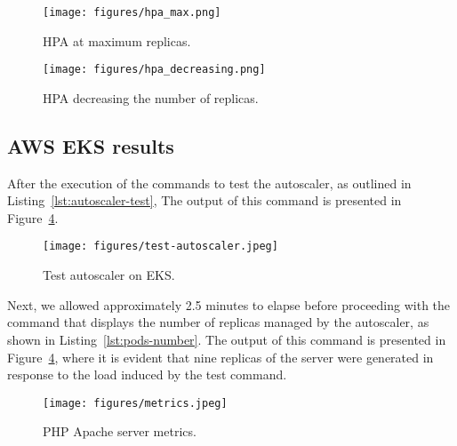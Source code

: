 \begin{figure}[!htbp]
  \centering
  \texttt{[image: figures/hpa\_max.png]}
  \caption{HPA at maximum replicas.}
  \label{fig:hpa_max}
\end{figure}

\begin{figure}[!htbp]
  \centering
  \texttt{[image: figures/hpa\_decreasing.png]}
  \caption{HPA decreasing the number of replicas.}
  \label{fig:hpa_decreasing}
\end{figure}


\subsection{AWS EKS results}

After the execution of the commands to test the autoscaler, as outlined in Listing~\ref{lst:autoscaler-test}, The output of this command is presented in Figure~\ref{fig:metrics}.

\begin{figure}[!htbp]
  \centering
  \texttt{[image: figures/test-autoscaler.jpeg]}
  \caption{Test autoscaler on EKS.}
  \label{fig:test-autoscaler}
\end{figure}

Next, we allowed approximately 2.5 minutes to elapse before proceeding with the command that displays the number of replicas managed by the autoscaler, as shown in Listing~\ref{lst:pods-number}. The output of this command is presented in Figure~\ref{fig:metrics}, where it is evident that nine replicas of the server were generated in response to the load induced by the test command.

\begin{figure}[!htbp]
  \centering
  \texttt{[image: figures/metrics.jpeg]}
  \caption{PHP Apache server metrics.}
  \label{fig:metrics}
\end{figure}
